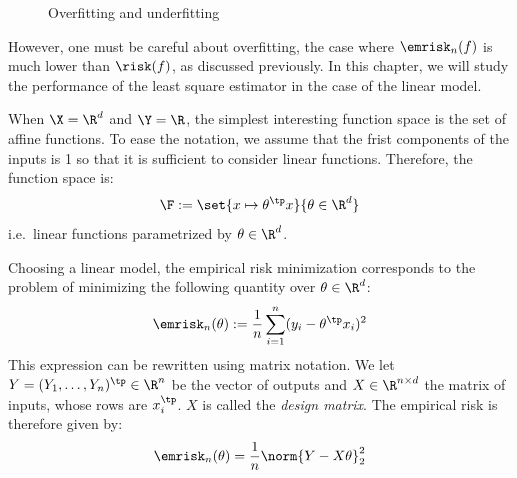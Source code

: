 \documentclass[toc, titlepaged]{../cs-classes/cs-classes}
\begin{document}
\begin{figure}
    \centering
    \captionsetup{justification=centering}
    \caption{Overfitting and underfitting}
\end{figure}
However, one must be careful about overfitting, the case where $\emrisk_n(f)$ is much lower than $\risk(f)$, as discussed previously. In this chapter, we will study the performance of the least square estimator in the case of the linear model.

\begin{definition}
    When $\X=\R^d$ and $\Y=\R$, the simplest interesting function space is the set of affine functions. To ease the notation, we assume that the frist components of the inputs is 1 so that it is sufficient to consider linear functions. Therefore, the function space is:
    \begin{equation}
        \F:=\set{x\mapsto \theta^\tp x}{\theta\in\R^d}
    \end{equation}
    i.e.~linear functions parametrized by $\theta\in\R^d$.
\end{definition}

\begin{remark}
    Choosing a linear model, the empirical risk minimization corresponds to the problem of minimizing the following quantity over $\theta\in\R^d$:
    \begin{equation*}
        \emrisk_n(\theta):=\frac{1}{n}\sum_{i=1}^n(y_i-\theta^\tp x_i)^2
    \end{equation*}
    This expression can be rewritten using matrix notation. We let $Y=(Y_1, \dots, Y_n)^\tp\in\R^n$ be the vector of outputs and $X\in\R^{n\times d}$ the matrix of inputs, whose rows are $x_i^\tp$. $X$ is called the \emph{design matrix}. The empirical risk is therefore given by:
    \begin{equation*}
        \emrisk_n(\theta)=\frac{1}{n}\norm{Y-X\theta}^2_2
    \end{equation*}
\end{remark}
\end{document}
